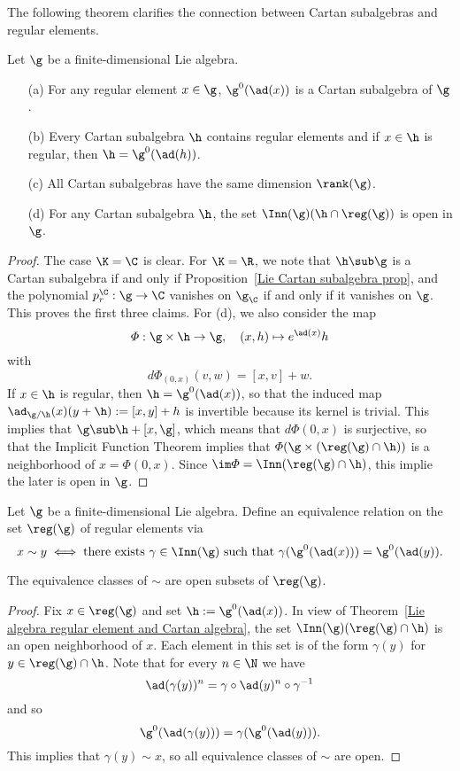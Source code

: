 The following theorem clarifies the connection between Cartan subalgebras and regular elements.
\begin{theorem}\label{Lie algebra regular element and Cartan algebra}
Let $\g$ be a finite-dimensional Lie algebra.
\begin{itemize}
\item[(a)] For any regular element $x\in\g$, $\g^0(\ad(x))$ is a Cartan subalgebra of $\g$.
\item[(b)] Every Cartan subalgebra $\h$ contains regular elements and if $x\in\h$ is regular, then $\h=\g^0(\ad(h))$.
\item[(c)] All Cartan subalgebras have the same dimension $\rank(\g)$.
\item[(d)] For any Cartan subalgebra $\h$, the set $\Inn(\g)(\h\cap\reg(\g))$ is open in $\g$.
\end{itemize}
\end{theorem}
\begin{proof}
The case $\K=\C$ is clear. For $\K=\R$, we note that $\h\sub\g$ is a Cartan subalgebra if and only if Proposition~\ref{Lie Cartan subalgebra prop}, and the polynomial $p_r^{\C}:\g\to\C$ vanishes on $\g_{\C}$ if and only if it vanishes on $\g$. This proves the first three claims. For (d), we also consider the map
\[\varPhi:\g\times\h\to\g,\quad (x,h)\mapsto e^{\ad(x)}h\]
with
\[d\varPhi_{(0,x)}(v,w)=[x,v]+w.\]
If $x\in\h$ is regular, then $\h=\g^0(\ad(x))$, so that the induced map $\ad_{\g/\h}(x)(y+\h):=[x,y]+h$ is invertible because its kernel is trivial. This implies that $\g\sub\h+[x,\g]$, which means that $d\varPhi(0,x)$ is surjective, so that the Implicit Function Theorem implies that $\varPhi(\g\times(\reg(\g)\cap\h))$ is a neighborhood of $x=\varPhi(0,x)$. Since $\im\varPhi=\Inn(\reg(\g)\cap\h)$, this implie the later is open in $\g$.
\end{proof}
Let $\g$ be a finite-dimensional Lie algebra. Define an equivalence relation on the set $\reg(\g)$ of regular elements via
\[x\sim y\iff\text{there exists $\gamma\in\Inn(\g)$ such that $\gamma(\g^0(\ad(x)))=\g^0(\ad(y))$}.\]
\begin{lemma}
The equivalence classes of $\sim$ are open subsets of $\reg(\g)$.
\end{lemma}
\begin{proof}
Fix $x\in\reg(\g)$ and set $\h:=\g^0(\ad(x))$. In view of Theorem~\ref{Lie algebra regular element and Cartan algebra}, the set $\Inn(\g)(\reg(\g)\cap\h)$ is an open neighborhood of $x$. Each element in this set is of the form $\gamma(y)$ for $y\in\reg(\g)\cap\h$. Note that for every $n\in\N$ we have
\[\ad(\gamma(y))^n=\gamma\circ\ad(y)^n\circ\gamma^{-1}\]
and so 
\[\g^0(\ad(\gamma(y)))=\gamma(\g^0(\ad(y))).\]
This implies that $\gamma(y)\sim x$, so all equivalence classes of $\sim$ are open.
\end{proof}
